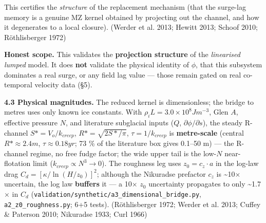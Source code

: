 \documentclass[tc, manuscript]{copernicus}
\begin{document}
This certifies the \emph{structure} of the replacement mechanism (that the surge-lag memory is a genuine MZ kernel obtained by projecting out the channel, and how it degenerates to a local closure). (Werder et al. 2013; Hewitt 2013; Schoof 2010; Röthlisberger 1972)

\textbf{Honest scope.} This validates the \textbf{projection structure} of the \emph{linearised lumped} model. It does \textbf{not} validate the physical identity of $\phi $, that this subsystem dominates a real surge, or any field lag value — those remain gated on real co-temporal velocity data (§5).

\textbf{4.3 Physical magnitudes.} The reduced kernel is dimensionless; the bridge to metres uses only known ice constants. With $\rho _{i}L=3.0\times 10^{8} J m^{-3}$, Glen $A$, effective pressure $N$, and literature subglacial inputs ($Q$, $\partial \phi /\partial s$), the steady R-channel $S*=V_{o}/k_{creep}$, $R*=\sqrt{2S*/\pi }$, $\tau =1/k_{creep}$ is \textbf{metre-scale} (central $R*\approx 2.4 m$, $\tau \approx 0.18 yr$; 73 \% of the literature box gives 0.1–50 m) — the R-channel regime, no free fudge factor; the wide upper tail is the low-$N$ near-flotation limit ($k_{creep}\propto N^{3}\to 0$). The roughness leg uses $z_{0}=c_{z}\cdot a$ in the log-law drag $C_{d}=[\kappa /\ln(H/z_{0})]^{2}$; although the Nikuradse prefactor $c_{z}$ is \textasciitilde{}10\ensuremath{\times} uncertain, the log law \textbf{buffers} it — a 10\ensuremath{\times} $z_{0}$ uncertainty propagates to only \textasciitilde{}1.7\ensuremath{\times} in $C_{d}$ (\texttt{validation/\allowbreak{}synthetic/\allowbreak{}a3\_\allowbreak{}dimensional\_\allowbreak{}bridge.\allowbreak{}py}, \texttt{a2\_\allowbreak{}z0\_\allowbreak{}roughness.\allowbreak{}py}; 6+5 tests). (Röthlisberger 1972; Werder et al. 2013; Cuffey \& Paterson 2010; Nikuradse 1933; Curl 1966)
\end{document}
